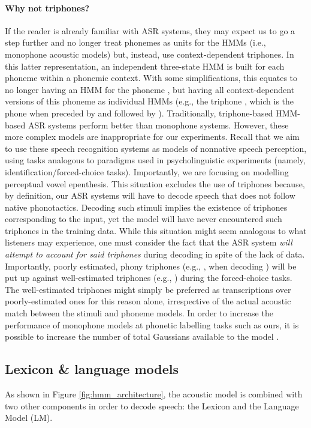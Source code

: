 \paragraph{Why not triphones?}
If the reader is already familiar with ASR systems, they may expect us to go a step further and no longer treat phonemes as units for the HMMs (i.e., monophone acoustic models) but, instead, use context-dependent triphones. In this latter representation, an independent three-state HMM is built for each phoneme within a phonemic context. With some simplifications, this equates to no longer having an HMM for the phoneme , but having all context-dependent versions of this phoneme as individual HMMs (e.g., the triphone , which is the phone  when preceded by  and followed by ).
Traditionally, triphone-based HMM-based ASR systems perform better than monophone systems. However, these more complex models are inappropriate for our experiments. Recall that we aim to use these speech recognition systems as models of nonnative speech perception, using tasks analogous to paradigms used in psycholinguistic experiments (namely, identification/forced-choice tasks). Importantly, we are focusing on modelling perceptual vowel epenthesis. This situation excludes the use of triphones because, by definition, our ASR systems will have to decode speech that does not follow native phonotactics. Decoding such stimuli implies the existence of triphones corresponding to the input, yet the model will have never encountered such triphones in the training data. While this situation might seem analogous to what listeners may experience, one must consider the fact that the ASR system \textit{will attempt to account for said triphones} during decoding in spite of the lack of data. Importantly, poorly estimated, phony triphones (e.g., , when decoding ) will be put up against well-estimated triphones (e.g., ) during the forced-choice tasks. The well-estimated triphones might simply be preferred as transcriptions over poorly-estimated ones for this reason alone, irrespective of the actual acoustic match between the stimuli and phoneme models.
In order to increase the performance of monophone models at phonetic labelling tasks such as ours, it is possible to increase the number of total Gaussians available to the model \cite{saraclar2001}. 

\subsection{Lexicon \& language models} \label{hmm_lm}
As shown in Figure \ref{fig:hmm_architecture}, the acoustic model is combined with two other components in order to decode speech: the Lexicon and the Language Model (LM).

